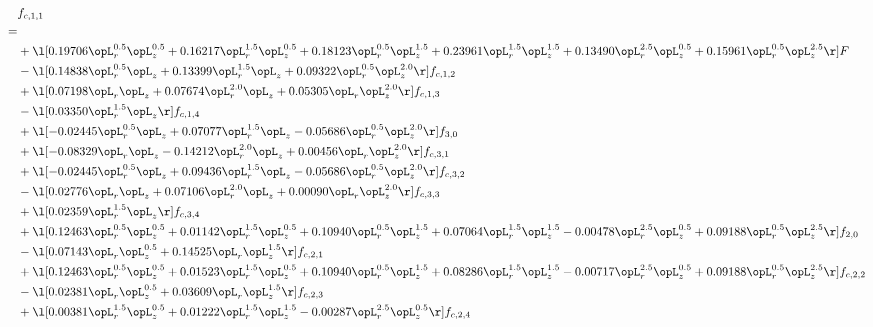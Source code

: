 \begin{alignat}{2} 
\label{eq:f_11_2} 
& f_{c,1,1} \nonumber \\ 
 = \\ 
& + \l[  0.19706 \opL_r^{0.5} \opL_z^{0.5} +  0.16217 \opL_r^{1.5} \opL_z^{0.5} +  0.18123 \opL_r^{0.5} \opL_z^{1.5} +  0.23961 \opL_r^{1.5} \opL_z^{1.5} +  0.13490 \opL_r^{2.5} \opL_z^{0.5} +  0.15961 \opL_r^{0.5} \opL_z^{2.5}  \r] F \nonumber \\ 
& - \l[  0.14838 \opL_r^{0.5} \opL_z +  0.13399 \opL_r^{1.5} \opL_z +  0.09322 \opL_r^{0.5} \opL_z^{2.0}  \r] f_{c,1,2} \nonumber \\ 
& + \l[  0.07198 \opL_r \opL_z +  0.07674 \opL_r^{2.0} \opL_z +  0.05305 \opL_r \opL_z^{2.0}  \r] f_{c,1,3} \nonumber \\ 
& - \l[  0.03350 \opL_r^{1.5} \opL_z  \r] f_{c,1,4} \nonumber \\ 
& + \l[  -0.02445 \opL_r^{0.5} \opL_z +  0.07077 \opL_r^{1.5} \opL_z   -0.05686 \opL_r^{0.5} \opL_z^{2.0}  \r] f_{3,0} \nonumber \\ 
& + \l[  -0.08329 \opL_r \opL_z   -0.14212 \opL_r^{2.0} \opL_z +  0.00456 \opL_r \opL_z^{2.0}  \r] f_{c,3,1} \nonumber \\ 
& + \l[  -0.02445 \opL_r^{0.5} \opL_z +  0.09436 \opL_r^{1.5} \opL_z   -0.05686 \opL_r^{0.5} \opL_z^{2.0}  \r] f_{c,3,2} \nonumber \\ 
& - \l[  0.02776 \opL_r \opL_z +  0.07106 \opL_r^{2.0} \opL_z +  0.00090 \opL_r \opL_z^{2.0}  \r] f_{c,3,3} \nonumber \\ 
& + \l[  0.02359 \opL_r^{1.5} \opL_z  \r] f_{c,3,4} \nonumber \\ 
& + \l[  0.12463 \opL_r^{0.5} \opL_z^{0.5} +  0.01142 \opL_r^{1.5} \opL_z^{0.5} +  0.10940 \opL_r^{0.5} \opL_z^{1.5} +  0.07064 \opL_r^{1.5} \opL_z^{1.5}   -0.00478 \opL_r^{2.5} \opL_z^{0.5} +  0.09188 \opL_r^{0.5} \opL_z^{2.5}  \r] f_{2,0} \nonumber \\ 
& - \l[  0.07143 \opL_r \opL_z^{0.5} +  0.14525 \opL_r \opL_z^{1.5}  \r] f_{c,2,1} \nonumber \\ 
& + \l[  0.12463 \opL_r^{0.5} \opL_z^{0.5} +  0.01523 \opL_r^{1.5} \opL_z^{0.5} +  0.10940 \opL_r^{0.5} \opL_z^{1.5} +  0.08286 \opL_r^{1.5} \opL_z^{1.5}   -0.00717 \opL_r^{2.5} \opL_z^{0.5} +  0.09188 \opL_r^{0.5} \opL_z^{2.5}  \r] f_{c,2,2} \nonumber \\ 
& - \l[  0.02381 \opL_r \opL_z^{0.5} +  0.03609 \opL_r \opL_z^{1.5}  \r] f_{c,2,3} \nonumber \\ 
& + \l[  0.00381 \opL_r^{1.5} \opL_z^{0.5} +  0.01222 \opL_r^{1.5} \opL_z^{1.5}   -0.00287 \opL_r^{2.5} \opL_z^{0.5}  \r] f_{c,2,4} \nonumber \\ 

\end{alignat}
